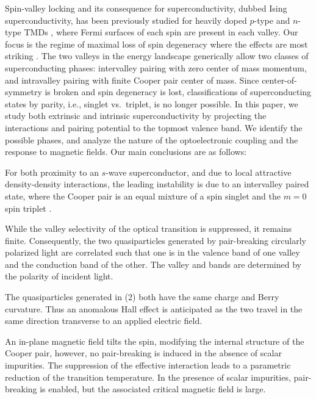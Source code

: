 Spin-valley locking and its consequence for superconductivity,
dubbed Ising superconductivity, has been previously studied
for heavily doped $p$-type and $n$-type TMDs
\cite{%
  Lu1353,%
  Xi2016,%
  Saito2016,%
  PhysRevB.93.180501,%
  PhysRevLett.113.097001%
},
where Fermi surfaces of each spin are present in each valley.
Our focus is the regime of maximal loss of spin degeneracy where the
effects are most striking
\cite{PhysRevB.94.060501}.
The two valleys in the energy landscape generically allow
two classes of superconducting phases:
intervalley pairing with zero center of mass momentum,
and intravalley pairing with finite Cooper pair center of mass.
Since center-of-symmetry is broken and spin degeneracy is lost,
classifications of superconducting states by parity,
i.e., singlet vs.\ triplet, is no longer possible.
In this paper, we study both extrinsic and intrinsic superconductivity
by projecting the interactions and pairing potential to
the topmost valence band.
We identify the possible phases, and analyze the nature
of the optoelectronic coupling and the response to magnetic fields.
Our main conclusions are as follows:

\introparanum{}
For both proximity to an $s$-wave superconductor,
and due to local attractive density-density interactions,
the leading instability is due to an intervalley paired state,
where the Cooper pair is an equal mixture
of a spin singlet and the $m = 0$ spin triplet
\cite{PhysRevLett.87.037004}.

\introparanum{}
While the valley selectivity of the optical transition is suppressed,
it remains finite.
Consequently, the two quasiparticles
generated by pair-breaking circularly polarized light
are correlated such that one is in the valence band of one valley
and the conduction band of the other.
The valley and bands are determined by the polarity of incident light.

\introparanum{}
The quasiparticles generated in (2)
both have the same charge and Berry curvature.
Thus an anomalous Hall effect is anticipated
as the two travel in the same direction transverse to an applied electric field.

\introparanum{}
An in-plane magnetic field tilts the spin,
modifying the internal structure of the Cooper pair,
however, no pair-breaking is induced in the absence of scalar impurities.
The suppression of the effective interaction leads
to a parametric reduction of the transition temperature.
In the presence of scalar impurities, pair-breaking is enabled,
but the associated critical magnetic field is large.
